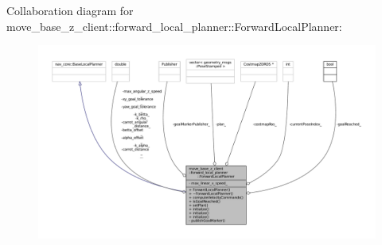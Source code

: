 Collaboration diagram for move\+\_\+base\+\_\+z\+\_\+client\+:\+:forward\+\_\+local\+\_\+planner\+:\+:Forward\+Local\+Planner\+:
\nopagebreak
\begin{figure}[H]
\begin{center}
\leavevmode
\includegraphics[width=350pt]{classmove__base__z__client_1_1forward__local__planner_1_1ForwardLocalPlanner__coll__graph}
\end{center}
\end{figure}
